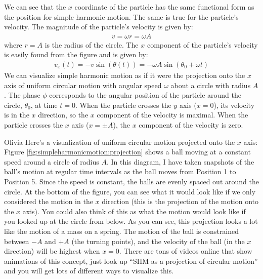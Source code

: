 We can see that the $x$ coordinate of the particle has the same functional form as the position for simple harmonic motion. The same is true for the particle's velocity. The magnitude of the particle's velocity is given by:
\begin{align*}
v = \omega r = \omega A
\end{align*}
where $r=A$ is the radius of the circle. The $x$ component of the particle's velocity is easily found from the figure and is given by:
\begin{align*}
v_x(t) = -v\sin(\theta(t)) = -\omega A\sin(\theta_0 + \omega t)
\end{align*}
We can visualize simple harmonic motion as if it were the projection onto the $x$ axis of uniform circular motion with angular speed $\omega$ about a circle with radius $A$. The phase $\phi$ corresponds to the angular position of the particle around the circle, $\theta_0$, at time $t=0$. When the particle crosses the $y$ axis ($x=0$), its velocity is in the $x$ direction, so the $x$ component of the velocity is maximal. When the particle crosses the $x$ axis ($x=\pm A$), the $x$ component of the velocity is zero.

\begin{studentOpinion}{Olivia}
Here's a visualization of uniform circular motion projected onto the $x$ axis:
Figure \ref{fig:simpleharmonicmotion:projection} shows a ball moving at a constant speed around a circle of radius $A$. In this diagram, I have taken snapshots of the ball's motion at regular time intervals as the ball moves from Position 1 to Position 5. Since the speed is constant, the balls are evenly spaced out around the circle. At the bottom of the figure, you can see what it would look like if we only considered the motion in the $x$ direction (this is the projection of the motion onto the $x$ axis). You could also think of this as what the motion would look like if you looked up at the circle from below. As you can see, this projection looks a lot like the motion of a mass on a spring. The motion of the ball is constrained between $-A$ and $+A$ (the turning points), and the velocity of the ball (in the $x$ direction) will be highest when $x=0$. There are tons of videos online that show animations of this concept, just look up ``SHM as a projection of circular motion'' and you will get lots of different ways to visualize this.
\end{studentOpinion}



